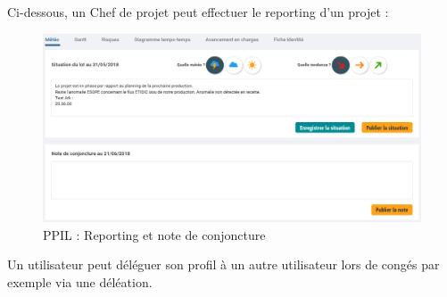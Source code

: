 Ci-dessous, un Chef de projet peut effectuer le reporting d'un projet :

\begin{figure}[!h]
\centering
\includegraphics[width=1\textwidth]{images/ppil-meteo.PNG}
\caption{PPIL : Reporting et note de conjoncture}
\end{figure}

Un utilisateur peut déléguer son profil à un autre utilisateur lors de congés par exemple via une déléation.

